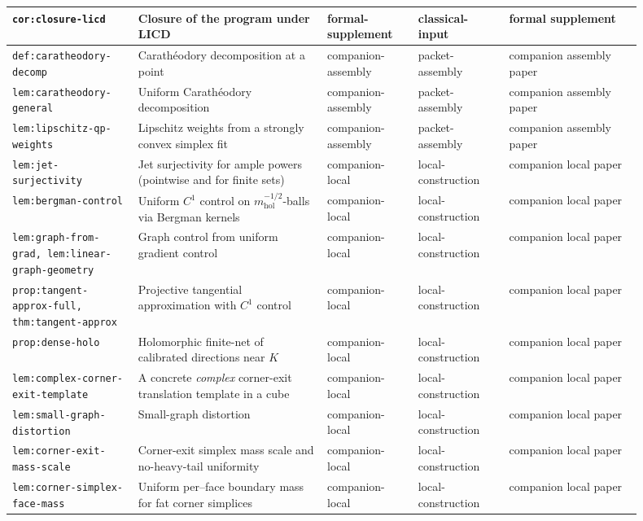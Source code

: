 \documentclass[11pt]{article}
\numberwithin{equation}{section}  %
\theoremstyle{plain}
\theoremstyle{definition}
\theoremstyle{remark}
\newcommand{\mhol}{m_{\mathrm{hol}}} %
\begin{document}
\begin{longtable}{|p{0.18\linewidth}|p{0.27\linewidth}|p{0.13\linewidth}|p{0.13\linewidth}|p{0.19\linewidth}|}
\texttt{cor:closure-licd} & Closure of the program under LICD & formal-supplement & classical-input & formal supplement \\ \hline
\texttt{def:caratheodory-decomp} & Carath\'eodory decomposition at a point & companion-assembly & packet-assembly & companion assembly paper \\ \hline
\texttt{lem:caratheodory-general} & Uniform Carath\'eodory decomposition & companion-assembly & packet-assembly & companion assembly paper \\ \hline
\texttt{lem:lipschitz-qp-weights} & Lipschitz weights from a strongly convex simplex fit & companion-assembly & packet-assembly & companion assembly paper \\ \hline
\texttt{lem:jet-surjectivity} & Jet surjectivity for ample powers (pointwise and for finite sets) & companion-local & local-construction & companion local paper \\ \hline
\texttt{lem:bergman-control} & Uniform $C^1$ control on $\mhol^{-1/2}$-balls via Bergman kernels & companion-local & local-construction & companion local paper \\ \hline
\texttt{lem:graph-from-grad, lem:linear-graph-geometry} & Graph control from uniform gradient control & companion-local & local-construction & companion local paper \\ \hline
\texttt{prop:tangent-approx-full, thm:tangent-approx} & Projective tangential approximation with $C^1$ control & companion-local & local-construction & companion local paper \\ \hline
\texttt{prop:dense-holo} & Holomorphic finite-net of calibrated directions near $K$ & companion-local & local-construction & companion local paper \\ \hline
\texttt{lem:complex-corner-exit-template} & A concrete \emph{complex} corner-exit translation template in a cube & companion-local & local-construction & companion local paper \\ \hline
\texttt{lem:small-graph-distortion} & Small-graph distortion & companion-local & local-construction & companion local paper \\ \hline
\texttt{lem:corner-exit-mass-scale} & Corner-exit simplex mass scale and no-heavy-tail uniformity & companion-local & local-construction & companion local paper \\ \hline
\texttt{lem:corner-simplex-face-mass} & {Uniform per--face boundary mass for fat corner simplices} & companion-local & local-construction & companion local paper \\ \hline

\end{longtable}
\end{document}
